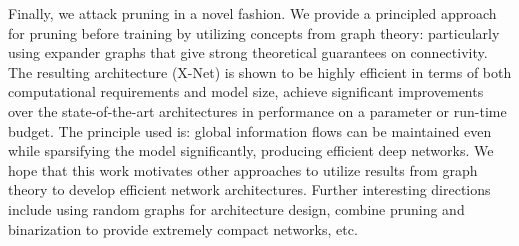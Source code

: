 \noindent Finally, we attack pruning in a novel fashion. We provide a principled approach for pruning before training by utilizing concepts from graph theory: particularly using expander graphs that give strong theoretical guarantees on connectivity. The resulting architecture (X-Net) is shown to be highly efficient in terms of both computational requirements and model size, achieve significant improvements over the state-of-the-art architectures in performance on a parameter or run-time budget. The principle used is: global information flows can be maintained even while sparsifying the model significantly, producing efficient deep networks.  We hope that this work motivates other approaches to utilize results from graph theory to develop efficient network architectures. Further interesting directions include using random graphs for architecture design, combine pruning and binarization to provide extremely compact networks, etc.